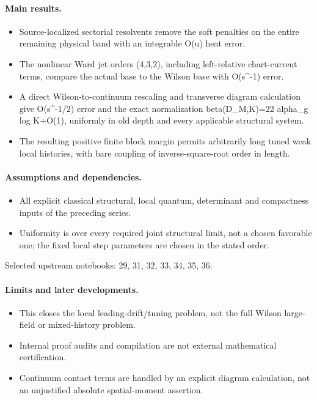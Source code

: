 \documentclass[11pt]{article}
\theoremstyle{remark}
\begin{document}
\paragraph{Main results.}
\begin{itemize}
\item Source-localized sectorial resolvents remove the soft penalties on the entire remaining physical band with an integrable O(u) heat error.
\item The nonlinear Ward jet orders (4,3,2), including left-relative chart-current terms, compare the actual base to the Wilson base with O(s\textasciicircum{}-1) error.
\item A direct Wilson-to-continuum rescaling and transverse diagram calculation give O(s\textasciicircum{}-1/2) error and the exact normalization beta(D\_M,K)=22 alpha\_g log K+O(1), uniformly in old depth and every applicable structural system.
\item The resulting positive finite block margin permits arbitrarily long tuned weak local histories, with bare coupling of inverse-square-root order in length.
\end{itemize}

\paragraph{Assumptions and dependencies.}
\begin{itemize}
\item All explicit classical structural, local quantum, determinant and compactness inputs of the preceding series.
\item Uniformity is over every required joint structural limit, not a chosen favorable one; the fixed local step parameters are chosen in the stated order.
\end{itemize}

Selected upstream notebooks: 29, 31, 32, 33, 34, 35, 36.\par

\paragraph{Limits and later developments.}
\begin{itemize}
\item This closes the local leading-drift/tuning problem, not the full Wilson large-field or mixed-history problem.
\item Internal proof audits and compilation are not external mathematical certification.
\item Continuum contact terms are handled by an explicit diagram calculation, not an unjustified absolute spatial-moment assertion.
\end{itemize}
\end{document}

